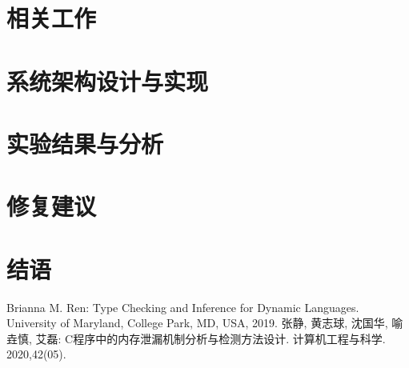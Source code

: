 \documentclass[conference]{IEEEtran}
\begin{document}
\section{相关工作}

\section{系统架构设计与实现}




\section{实验结果与分析}




\section{修复建议}\label{sec-analysis}


\section{结语}


\begin{thebibliography}{99}

Brianna M. Ren:
Type Checking and Inference for Dynamic Languages. University 
of Maryland, College Park, MD, USA, 2019.
张静, 黄志球, 沈国华, 喻垚慎, 艾磊:
C程序中的内存泄漏机制分析与检测方法设计. 计算机工程与科学. 2020,42(05).
\end{thebibliography}
\end{document}
